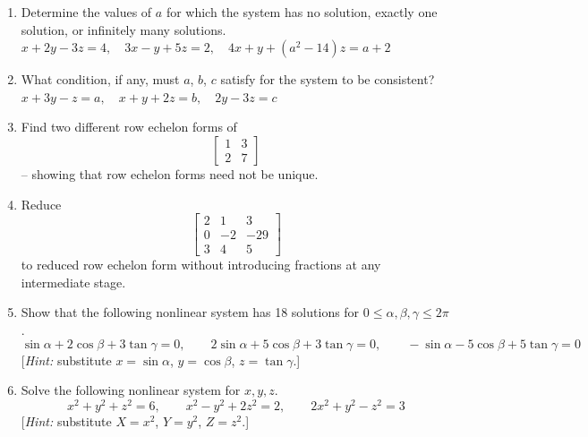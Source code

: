 \documentclass{article}
\theoremstyle{mystyle}
\begin{document}
\begin{enumerate}
    \item[25.] Determine the values of $a$ for which the system has no solution, exactly one solution, or infinitely many solutions.\\
    $x+2y-3z=4,\quad 3x-y+5z=2,\quad 4x+y+(a^2-14)z=a+2$

    \item[27.] What condition, if any, must $a$, $b$, $c$ satisfy for the system to be consistent?\\
    $x+3y-z=a,\quad x+y+2z=b,\quad 2y-3z=c$

    \item[31.] Find two different row echelon forms of
    \[
    \begin{bmatrix}1&3\\2&7\end{bmatrix}
    \]
    -- showing that row echelon forms need not be unique.

    \item[32.] Reduce
    \[
    \begin{bmatrix}2&1&3\\0&-2&-29\\3&4&5\end{bmatrix}
    \]
    to reduced row echelon form without introducing fractions at any intermediate stage.

    \item[33.] Show that the following nonlinear system has 18 solutions for $0\le\alpha,\beta,\gamma\le2\pi$.
    \[
    \sin\alpha+2\cos\beta+3\tan\gamma=0,\qquad 2\sin\alpha+5\cos\beta+3\tan\gamma=0,\qquad -\sin\alpha-5\cos\beta+5\tan\gamma=0
    \]
    [\emph{Hint:} substitute $x=\sin\alpha$, $y=\cos\beta$, $z=\tan\gamma$.]

    \item[35.] Solve the following nonlinear system for $x,y,z$.
    \[
    x^2+y^2+z^2=6,\qquad x^2-y^2+2z^2=2,\qquad 2x^2+y^2-z^2=3
    \]
    [\emph{Hint:} substitute $X=x^2$, $Y=y^2$, $Z=z^2$.]


\end{enumerate}
\end{document}
